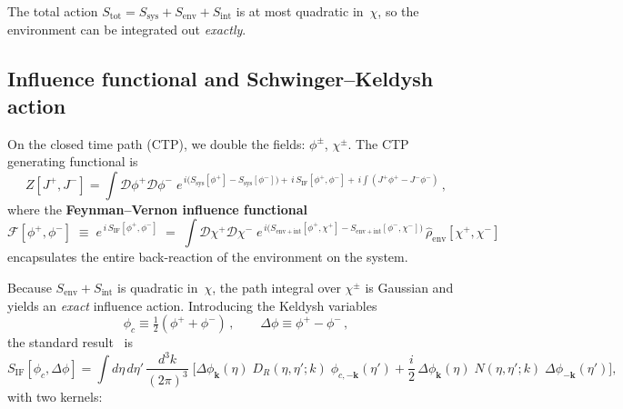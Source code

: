 \documentclass[12pt,a4paper]{article}
\begin{document}
\noindent
The total action
$S_{\mathrm{tot}}=S_{\mathrm{sys}}+S_{\mathrm{env}}+S_{\mathrm{int}}$
is at most quadratic in~$\chi$, so the environment can be integrated
out \emph{exactly}.

\subsection{Influence functional and
  Schwinger--Keldysh action}\label{ssec:influence-functional}

On the closed time path (CTP), we double the fields:
$\phi^{\pm}$, $\chi^{\pm}$.  The CTP generating functional is
\begin{equation}\label{eq:CTP-Z}
  Z[J^{+},J^{-}]
  = \int\!\mathcal{D}\phi^{+}\mathcal{D}\phi^{-}\;
    e^{\,i\bigl(S_{\mathrm{sys}}[\phi^{+}]
      -S_{\mathrm{sys}}[\phi^{-}]\bigr)
      +\,i\,S_{\mathrm{IF}}[\phi^{+},\phi^{-}]
      +\,i\!\int\!(J^{+}\phi^{+}-J^{-}\phi^{-})}\,,
\end{equation}
where the \textbf{Feynman--Vernon influence functional}~\cite{FeynmanVernon1963}
\begin{equation}\label{eq:IF-def}
  \mathcal{F}[\phi^{+},\phi^{-}]
  \;\equiv\; e^{\,i\,S_{\mathrm{IF}}[\phi^{+},\phi^{-}]}
  \;=\; \int\!\mathcal{D}\chi^{+}\mathcal{D}\chi^{-}\;
  e^{\,i\bigl(S_{\mathrm{env+int}}[\phi^{+},\chi^{+}]
    -S_{\mathrm{env+int}}[\phi^{-},\chi^{-}]\bigr)}\,
  \hat{\rho}_{\mathrm{env}}[\chi^{+},\chi^{-}]
\end{equation}
encapsulates the entire back-reaction of the environment on the
system.

Because $S_{\mathrm{env}}+S_{\mathrm{int}}$ is quadratic in~$\chi$,
the path integral over $\chi^{\pm}$ is Gaussian and yields an
\emph{exact} influence action.  Introducing the Keldysh variables
\begin{equation}\label{eq:Keldysh-vars}
  \phi_{c}\equiv\tfrac{1}{2}(\phi^{+}+\phi^{-})\,,\qquad
  \Delta\phi\equiv\phi^{+}-\phi^{-}\,,
\end{equation}
the standard result~\cite{CalzettaHu2008,HuVerdaguer2008} is
\begin{equation}\label{eq:SIF}
  \boxed{
  S_{\mathrm{IF}}[\phi_{c},\Delta\phi]
  = \int\!d\eta\,d\eta'\,\frac{d^{3}k}{(2\pi)^{3}}\;
    \biggl[
      \Delta\phi_{\mathbf{k}}(\eta)\;
      D_{R}(\eta,\eta';k)\;\phi_{c,-\mathbf{k}}(\eta')
      + \frac{i}{2}\,\Delta\phi_{\mathbf{k}}(\eta)\;
      N(\eta,\eta';k)\;\Delta\phi_{-\mathbf{k}}(\eta')
    \biggr],}
\end{equation}
with two kernels:
\end{document}
